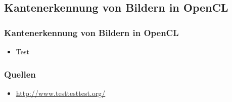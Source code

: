 \documentclass{beamer}
\begin{document}
\subsection{Kantenerkennung von Bildern in OpenCL}
\begin{frame}
\frametitle{Kantenerkennung von Bildern in OpenCL}
\begin{itemize}
\item Test
\end{itemize}
\end{frame}

\begin{appendix}
\begin{frame}
\frametitle{Quellen}
\begin{itemize}
\item \url{http://www.testtesttest.org/}
\end{itemize}
\end{frame}
\end{appendix}
\end{document}

